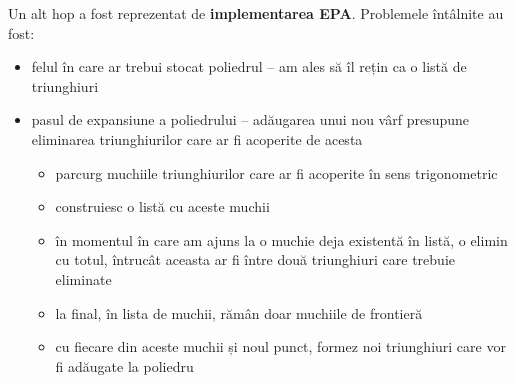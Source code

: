 \documentclass[12pt,a4paper]{report}
\begin{document}
Un alt hop a fost reprezentat de \textbf{implementarea EPA}. Problemele întâlnite au fost:
\begin{itemize}
	\item felul în care ar trebui stocat poliedrul -- am ales să îl rețin ca o listă de triunghiuri
	\item pasul de expansiune a poliedrului -- adăugarea unui nou vârf presupune eliminarea  triunghiurilor care ar fi acoperite de acesta
	\begin{itemize}
		\item parcurg muchiile triunghiurilor care ar fi acoperite în sens trigonometric
		\item construiesc o listă cu aceste muchii
		\item în momentul în care am ajuns la o muchie deja existentă în listă, o elimin cu totul, întrucât aceasta ar fi între două triunghiuri care trebuie eliminate
		\item la final, în lista de muchii, rămân doar muchiile de frontieră
		\item cu fiecare din aceste muchii și noul punct, formez noi triunghiuri care vor fi adăugate la poliedru
	\end{itemize}
\end{itemize}
\end{document}
